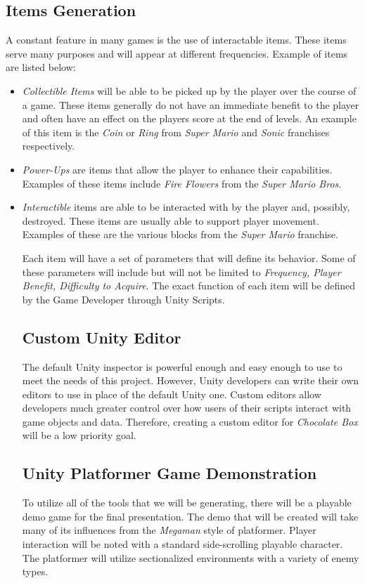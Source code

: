 \documentclass[pdftex,12pt,letter]{article}
\begin{document}
\begin{itemize}
\begin{itemize}
\subsection{Items Generation}
A constant feature in many games is the use of interactable items. These items serve many purposes and will appear at different frequencies. Example of items are listed below:
\begin{itemize}
\item \textit{Collectible Items} will be able to be picked up by the player over the course of a game. These items generally do not have an immediate benefit to the player and often have an effect on the players score at the end of levels. An example of this item is the \textit{Coin} or \textit{Ring} from \textit{Super Mario} and \textit{Sonic} franchises respectively. 

\item \textit{Power-Ups} are items that allow the player to enhance their capabilities. Examples of these items include \textit{Fire Flowers} from the \textit{Super Mario Bros}.

\item \textit{Interactible} items are able to be interacted with by the player and, possibly, destroyed. These items are usually able to support player movement. Examples of these are the various blocks from the \textit{Super Mario} franchise. \\

\endgroup

Each item will have a set of parameters that will define its behavior. Some of these parameters will include but will not be limited to \textit{Frequency, Player Benefit, Difficulty to Acquire}. The exact function of each item will be defined by the Game Developer through Unity Scripts. 
\\

\subsection{Custom Unity Editor}
The default Unity inspector is powerful enough and easy enough to use to meet the needs of this project. However, Unity developers can write their own editors to use in place of the default Unity one. Custom editors allow developers much greater control over how users of their scripts interact with game objects and data. Therefore, creating a custom editor for \textit{Chocolate Box} will be a low priority goal.

\subsection{Unity Platformer Game Demonstration}
To utilize all of the tools that we will be generating, there will be a playable demo game for the final presentation. The demo that will be created will take many of its influences from the \textit{Megaman} style of platformer.  Player interaction will be noted with a standard side-scrolling playable character. The platformer will utilize sectionalized environments with a variety of enemy types. 



\end{itemize}
\end{itemize}
\end{itemize}
\end{document}
